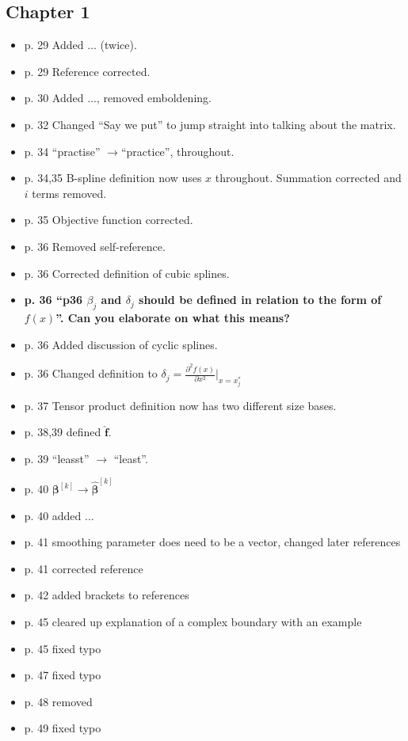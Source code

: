 \subsection{Chapter 1}
\begin{itemize}
\item p. 29 Added $\dots$ (twice).
\item p. 29 Reference corrected.
\item p. 30 Added $\dots$, removed emboldening.
\item p. 32 Changed ``Say we put'' to jump straight into talking about the matrix.
\item p. 34 ``practise'' $\rightarrow$``practice'', throughout.
\item p. 34,35 B-spline definition now uses $x$ throughout. Summation corrected and $i$ terms removed.
\item p. 35 Objective function corrected.
\item p. 36 Removed self-reference.
\item p. 36 Corrected definition of cubic splines.
\item \textbf{p. 36 ``p36 $\beta_j$ and $\delta_j$ should be defined in relation to the form of $f(x)$''. Can you elaborate on what this means?}
\item p. 36 Added discussion of cyclic splines.
\item p. 36 Changed definition to $\delta_j = \frac{\partial^2 f(x)}{\partial x^2}\vert_{x=x_j^*}$
\item p. 37 Tensor product definition now has two different size bases.
\item p. 38,39 defined $\mathbf{\hat{f}}$.
\item p. 39 ``leasst'' $\rightarrow$ ``least''.
\item p. 40 $\bm{\beta}^{[k]} \rightarrow \bm{\hat{\beta}}^{[k]}$
\item p. 40 added $\dots$
\item p. 41 smoothing parameter does need to be a vector, changed later references
\item p. 41 corrected reference
\item p. 42 added brackets to references
\item p. 45 cleared up explanation of a complex boundary with an example
\item p. 45 fixed typo
\item p. 47 fixed typo
\item p. 48 removed
\item p. 49 fixed typo
\end{itemize}

